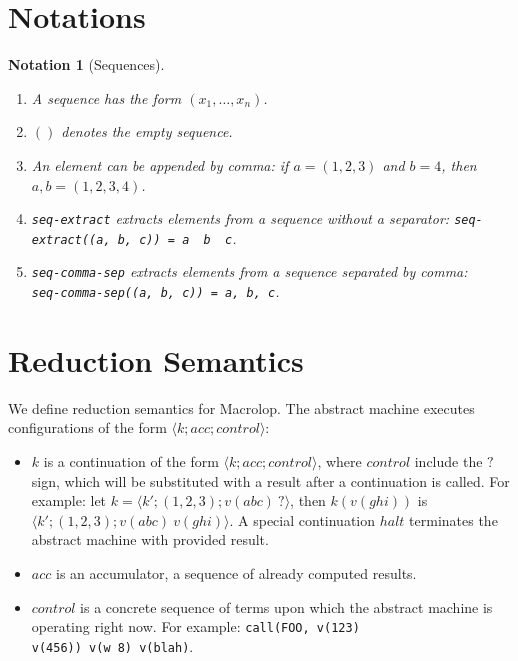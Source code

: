 \documentclass[12pt]{article}
\theoremstyle{break}
\newtheorem{notation}{Notation}
\begin{document}
\section{Notations}

\begin{notation}[Sequences]
    \begin{enumerate}
        \item A sequence has the form $(x_1, \ldots, x_n)$.
        \item $()$ denotes the empty sequence.
        \item An element can be appended by comma: if $a = (1, 2, 3)$ and $b = 4$, then $a, b = (1, 2, 3, 4)$.
        \item \texttt{seq-extract} extracts elements from a sequence without a separator:
        \texttt{seq-extract((a, b, c)) = a \ b \ c}.
        \item \texttt{seq-comma-sep} extracts elements from a sequence separated by comma: \\
        \texttt{seq-comma-sep((a, b, c)) = a, b, c}.
    \end{enumerate}
\end{notation}

\section{Reduction Semantics}
\label{ReductionSemantics}

We define reduction semantics for Macrolop. The abstract machine executes configurations
of the form $\langle k; acc; control \rangle$:

\begin{itemize}
    \item $k$ is a continuation of the form $\langle k; acc; control \rangle$, where
    $control$ include the $?$ sign, which will be substituted with a result after a
    continuation is called. For example: let $k = \langle k'; (1, 2, 3); v(abc) \ ? \rangle$,
    then $k(v(ghi))$ is $\langle k'; (1, 2, 3); v(abc) \ v(ghi) \rangle$. A special
    continuation $halt$ terminates the abstract machine with provided result.

    \item $acc$ is an accumulator, a sequence of already computed results.

    \item $control$ is a concrete sequence of terms upon which the abstract machine is
    operating right now. For example: \texttt{call(FOO, v(123) \\ v(456)) v(w 8) v(blah)}.
\end{itemize}
\end{document}
